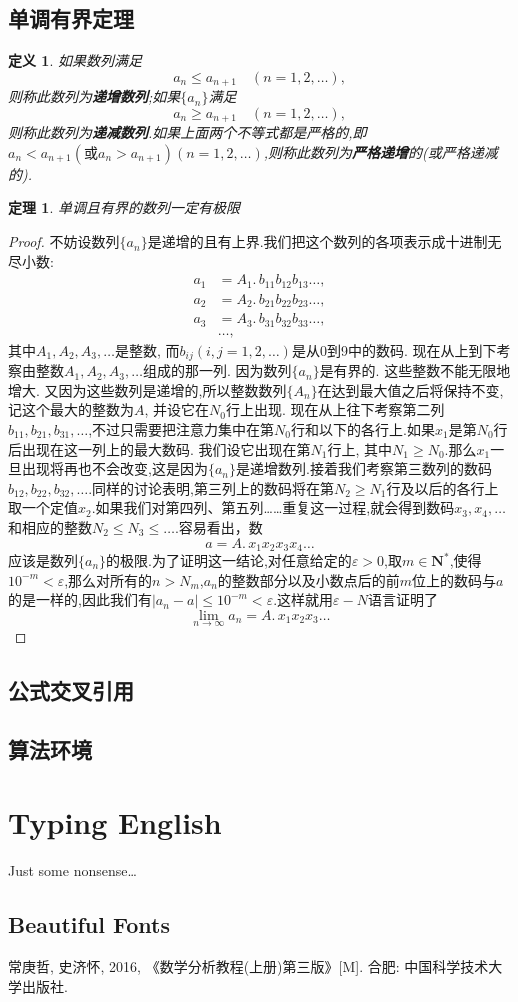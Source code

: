 \documentclass[UTF8,a4paper,twoside,zihao=-4]{ctexrep}
\theoremstyle{nonumberplain}
\newtheorem{proof}{证明}
\newtheorem{theorem}{定理}[chapter]
\newtheorem{definition}{定义}[chapter]
\newcommand{\nn}{\mathbf{N}^\ast}
\renewcommand{\leq}{\leqslant}
\renewcommand{\geq}{\geqslant}
\renewcommand{\epsilon}{\varepsilon}
\begin{document}
\section{单调有界定理}
\begin{definition}
如果数列满足
\[
a_n\leq a_{n+1}\quad(n=1,2,\dots),
\]
则称此数列为\textbf{递增数列};如果$\{a_n\}$满足
\[
a_n\geq a_{n+1}\quad(n=1,2,\dots),
\]
则称此数列为\textbf{递减数列}.如果上面两个不等式都是严格的,即$a_n<a_{n+1}(\mbox{或}a_n>a_{n+1})(n=1,2,\dots)$,则称此数列为\textbf{严格递增}的(或严格递减的).
\end{definition}
\begin{theorem}\label{T:DDYJ}
单调且有界的数列一定有极限
\end{theorem}
\begin{proof}
	不妨设数列$\{a_n\}$是递增的且有上界.我们把这个数列的各项表示成十进制无尽小数:
\[
\begin{aligned}
	a_1&=A_1.\,b_{11}b_{12}b_{13}\dots ,\\
	a_2&=A_2.\,b_{21}b_{22}b_{23}\dots ,\\
	a_3&=A_3.\,b_{31}b_{32}b_{33}\dots ,\\
	&\dots ,
\end{aligned}
\]
其中$A_1, A_2, A_3,\dots$是整数, 而$b_{ij}(i,j=1,2,\dots)$是从0到9中的数码. 现在从上到下考察由整数$A_1,A_2,A_3,\dots$组成的那一列. 因为数列$\{a_n\}$是有界的. 这些整数不能无限地增大. 又因为这些数列是递增的,所以整数数列$\{A_n\}$在达到最大值之后将保持不变, 记这个最大的整数为$A$, 并设它在$N_0$行上出现. 现在从上往下考察第二列$b_{11},b_{21},b_{31},\dots$,不过只需要把注意力集中在第$N_0$行和以下的各行上.如果$x_1$是第$N_0$行后出现在这一列上的最大数码. 我们设它出现在第$N_1$行上, 其中$N_1\geq N_0$.那么$x_1$一旦出现将再也不会改变,这是因为$\{a_n\}$是递增数列.接着我们考察第三数列的数码$b_{12},b_{22},b_{32},\dots$.同样的讨论表明,第三列上的数码将在第$N_2\geq N_1$行及以后的各行上取一个定值$x_2$.如果我们对第四列、第五列……重复这一过程,就会得到数码$x_3,x_4,\dots$和相应的整数$N_2\leq N_3\leq\dots$.容易看出，数
\[
a=A.\,x_1x_2x_3x_4\dots
\]
应该是数列$\{a_n\}$的极限.为了证明这一结论,对任意给定的$\epsilon>0$,取$m\in\nn$,使得$10^{-m}<\epsilon$,那么对所有的$n>N_m$,$a_n$的整数部分以及小数点后的前$m$位上的数码与$a$的是一样的,因此我们有$|a_n-a|\leq10^{-m}<\epsilon$.这样就用$\epsilon-N$语言证明了
\[
\lim_{n\to\infty}a_n=A.\,x_1x_2x_3\dots
\]
\end{proof}
\section{公式交叉引用}

\section{算法环境}

\chapter{Typing English}
Just some nonsense\dots
\section{Beautiful Fonts}
\lipsum

\begin{thebibliography}{99}

常庚哲, 史济怀, 2016, 《数学分析教程(上册)第三版》[M]. 合肥: 中国科学技术大学出版社. 
\end{thebibliography}
\end{document}

